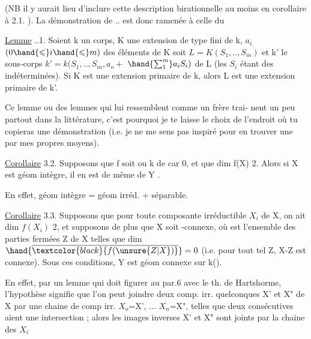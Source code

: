 
(NB il y aurait lieu d'inclure cette description birationnelle au moins
en corollaire à 2.1. ). La démonstration de .. est donc ramenée à
celle du

\uline{Lemme} ..1.  Soient k un corps, K une extension de type fini de k, 
$a_i$ $(0\hand{\leqslant} i\hand{\leqslant} m)$ des éléments de K  
 soit $L = K(S_1,..,S_m)$ et k' le sous-corps $k'= k(S_1,..,S_m,a_o +$
$\hand{\sum_{1}^{m}}a_iS_i)$ de L (les $S_i$ étant des indéterminées). \hand{,} Si K est une
extension primaire de k, alors L est une extension primaire de k'.

\margin{$|$} Ce lemme\hand{,} ou des lemmes qui lui ressemblent comme un frère\hand{,} trai-%
nent un peu partout dans la littérature, c'est pourquoi je te laisse le
choix de l'endroit où tu copieras une démonstration (i.e. je ne me sens
pas inspiré pour en trouver une par mes propres moyens).

\uline{Corollaire} 3.2. Supposons que f soit   ou k de car 0,
et que dim f(X)\over{$\hand{>}$}{$\geqslant$} 2. Alors si X est géom intègre, il en est de même de
Y\hand{$_\eta$} .

En effet, géom intègre = géom irréd. + séparable.

\uline{Corollaire} 3.3. Supposons  que pour toute composante irréductible $X_i$
de X, on ait dim $f(X_i)$\over{$\hand{>}$}{$\geqslant$} 2, et supposons de plus que X soit -connexe,
où  est l'ensemble des parties fermées Z de X telles que dim $\hand{\overline{\textcolor{black}{f(\unsure{Z|X})}}}=0$
(i.e. pour tout tel Z, X-Z est connexe). Sous ces conditions, Y\hand{$_\eta$} est
géom connexe sur k(\hand{$\eta$}).

En effet, par un lemme qui doit figurer au par.6 avec le th. de
Hartshorme, l'hypothèse signifie que l'on peut joindre deux comp. irr.
quelconques X' et X" de X par une chaine de comp irr. $X_o$=X', ...
$X_n$=X", telles que deux consécutives aient une intersection ; alors
les images inverses X'\hand{$_\eta$} et X"\hand{$_\eta$} sont joints par la chaine des $X_{i}$\hand{$_\eta$} 

